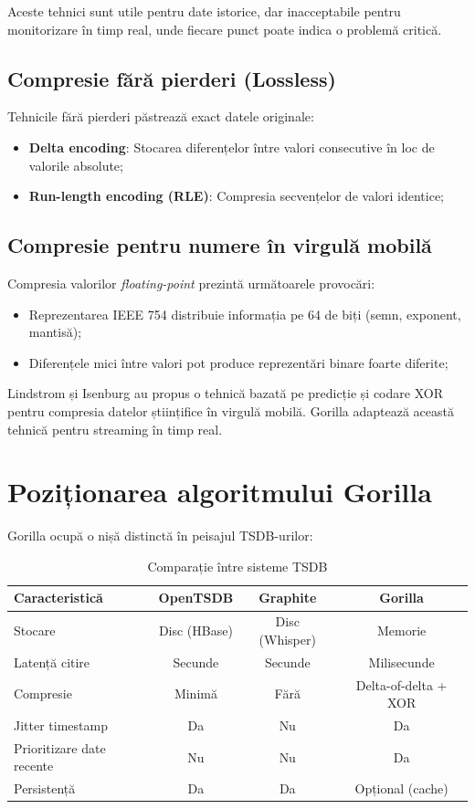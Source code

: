 Aceste tehnici sunt utile pentru date istorice, dar inacceptabile pentru monitorizare în timp real, unde fiecare punct poate indica o problemă critică.

\subsection{Compresie fără pierderi (Lossless)}

Tehnicile fără pierderi păstrează exact datele originale:

\begin{itemize}
    \item \textbf{Delta encoding}: Stocarea diferențelor între valori consecutive în loc de valorile absolute;
    \item \textbf{Run-length encoding (RLE)}: Compresia secvențelor de valori identice;
\end{itemize}

\subsection{Compresie pentru numere în virgulă mobilă}

Compresia valorilor \textit{floating-point} prezintă următoarele provocări:

\begin{itemize}
    \item Reprezentarea IEEE 754 distribuie informația pe 64 de biți (semn, exponent, mantisă);
    \item Diferențele mici între valori pot produce reprezentări binare foarte diferite;
\end{itemize}

Lindstrom și Isenburg \cite{lindstrom2006} au propus o tehnică bazată pe predicție și codare XOR pentru compresia datelor științifice în virgulă mobilă. Gorilla adaptează această tehnică pentru streaming în timp real.

\section{Poziționarea algoritmului Gorilla}

Gorilla ocupă o nișă distinctă în peisajul TSDB-urilor:

\begin{table}[h]
\centering
\begin{tabular}{@{}lccc@{}}
\toprule
\textbf{Caracteristică} & \textbf{OpenTSDB} & \textbf{Graphite} & \textbf{Gorilla} \\
\midrule
Stocare & Disc (HBase) & Disc (Whisper) & Memorie \\
Latență citire & Secunde & Secunde & Milisecunde \\
Compresie & Minimă & Fără & Delta-of-delta + XOR \\
Jitter timestamp & Da & Nu & Da \\
Prioritizare date recente & Nu & Nu & Da \\
Persistență & Da & Da & Opțional (cache) \\
\bottomrule
\end{tabular}
\caption{Comparație între sisteme TSDB}
\label{tab:tsdb-comparison}
\end{table}

